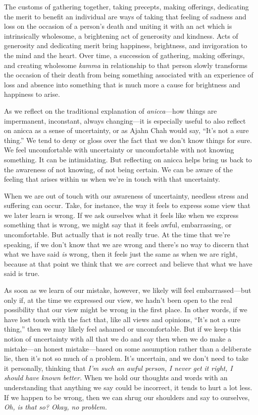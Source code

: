 The customs of gathering together, taking precepts, making offerings, 
dedicating the merit to benefit an individual are ways of taking that 
feeling of sadness and loss on the occasion of a person's death and 
uniting it with an act which is intrinsically wholesome, a brightening 
act of generosity and kindness. Acts of generosity and dedicating merit 
bring happiness, brightness, and invigoration to the mind and the 
heart. Over time, a succession of gathering, making offerings, and 
creating wholesome \emph{kamma} in relationship to that person slowly 
transforms the occasion of their death from being something associated 
with an experience of loss and absence into something that is much more 
a cause for brightness and happiness to arise.


As we reflect on the traditional explanation of \emph{anicca}---how 
things are impermanent, inconstant, always changing---it is especially 
useful to also reflect on anicca as a sense of uncertainty, or as Ajahn 
Chah would say, ``It's not a sure thing.'' We tend to deny or gloss 
over the fact that we don't know things for sure. We feel uncomfortable 
with uncertainty or uncomfortable with not knowing something. It can be 
intimidating. But reflecting on anicca helps bring us back to the 
awareness of not knowing, of not being certain. We can be aware of the 
feeling that arises within us when we're in touch with that uncertainty.

When we are out of touch with our awareness of uncertainty, needless 
stress and suffering can occur. Take, for instance, the way it feels to 
express some view that we later learn is wrong. If we ask ourselves 
what it feels like when we express something that is wrong, we might 
say that it feels awful, embarrassing, or uncomfortable. But actually 
that is not really true. At the time that we're speaking, if we don't 
know that we are wrong and there's no way to discern that what we have 
said \emph{is} wrong, then it feels just the same as when we are right, 
because at that point we think that we \emph{are} correct and believe 
that what we have said is true.

As soon as we learn of our mistake, however, we likely will feel 
embarrassed---but only if, at the time we expressed our view, we hadn't 
been open to the real possibility that our view might be wrong in the 
first place. In other words, if we have lost touch with the fact that, 
like all views and opinions, ``It's not a sure thing,'' then we may 
likely feel ashamed or uncomfortable. But if we keep this notion of 
uncertainty with all that we do and say then when we do make a 
mistake---an honest mistake---based on some assumption rather than a 
deliberate lie, then it's not so much of a problem. It's uncertain, and 
we don't need to take it personally, thinking that \emph{I'm such an 
awful person, I never get it right, I should have known better.} When 
we hold our thoughts and words with an understanding that anything we 
say could be incorrect, it tends to hurt a lot less. If we happen to be 
wrong, then we can shrug our shoulders and say to ourselves, \emph{Oh, 
is that so? Okay, no problem.}

